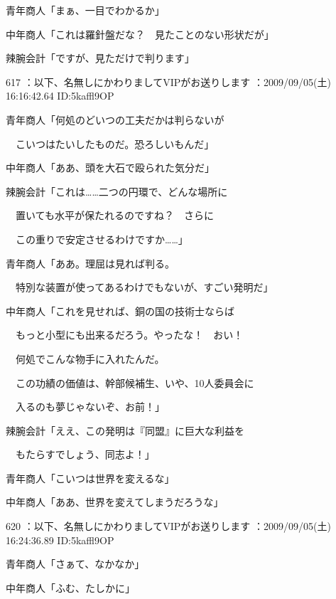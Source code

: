 \documentclass[a4j,twocolumn]{tarticle}
\begin{document}
青年商人「まぁ、一目でわかるか」 



中年商人「これは羅針盤だな？　見たことのない形状だが」\par{} 
辣腕会計「ですが、見ただけで判ります」 

	
    
    

617 ：以下、名無しにかわりましてVIPがお送りします ：2009/09/05(土) 16:16:42.64 ID:5kaffl9OP 


青年商人「何処のどいつの工夫だかは判らないが\par{} 
　こいつはたいしたものだ。恐ろしいもんだ」 



中年商人「ああ、頭を大石で殴られた気分だ」 



辣腕会計「これは……二つの円環で、どんな場所に\par{} 
　置いても水平が保たれるのですね？　さらに\par{} 
　この重りで安定させるわけですか……」 



青年商人「ああ。理屈は見れば判る。\par{} 
　特別な装置が使ってあるわけでもないが、すごい発明だ」 



中年商人「これを見せれば、銅の国の技術士ならば\par{} 
　もっと小型にも出来るだろう。やったな！　おい！\par{} 
　何処でこんな物手に入れたんだ。\par{} 
　この功績の価値は、幹部候補生、いや、10人委員会に\par{} 
　入るのも夢じゃないぞ、お前！」 



辣腕会計「ええ、この発明は『同盟』に巨大な利益を\par{} 
　もたらすでしょう、同志よ！」 



青年商人「こいつは世界を変えるな」\par{} 
中年商人「ああ、世界を変えてしまうだろうな」 

	
    
    

620 ：以下、名無しにかわりましてVIPがお送りします ：2009/09/05(土) 16:24:36.89 ID:5kaffl9OP 


青年商人「さぁて、なかなか」\par{} 
中年商人「ふむ、たしかに」 
\end{document}

